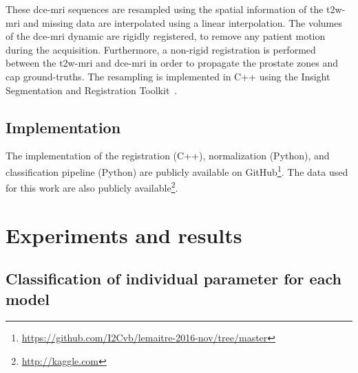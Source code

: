 These \ac{dce}-\ac{mri} sequences are resampled using the spatial information of the \ac{t2w}-\ac{mri} and missing data are interpolated using a linear interpolation.
The volumes of the \ac{dce}-\ac{mri} dynamic are rigidly registered, to remove any patient motion during the acquisition.
Furthermore, a non-rigid registration is performed between the \ac{t2w}-\ac{mri} and \ac{dce}-\ac{mri} in order to propagate the prostate zones and \ac{cap} ground-truths.
The resampling is implemented in C++ using the Insight Segmentation and Registration Toolkit~\citep{ibanez2005itk}.

\subsection{Implementation}

The implementation of the registration (C++), normalization (Python), and classification pipeline (Python) are publicly available on GitHub\footnote{\url{https://github.com/I2Cvb/lemaitre-2016-nov/tree/master}}.
The data used for this work are also publicly available\footnote{\url{http://kaggle.com}}.

\section{Experiments and results}\label{sec:experiments}

\subsection{Classification of individual parameter for each model}

